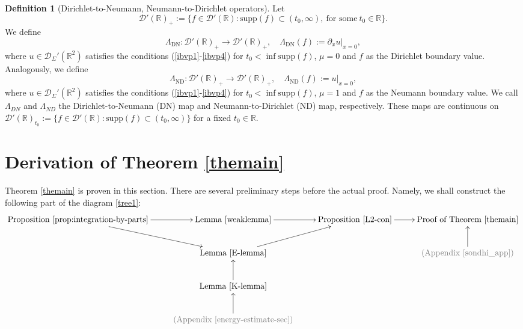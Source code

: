 \documentclass[10pt,a4paper]{article}
\theoremstyle{plain}
\theoremstyle{definition}
\newtheorem{definition}[theorem]{Definition}
\theoremstyle{remark}
\numberwithin{equation}{section}
\newcommand{\R}{\mathbb{R}}
\newcommand{\DN}{\Lambda_{\text{DN}}}
\newcommand{\ND}{\Lambda_{\text{ND}}}
\begin{document}
\begin{definition}[Dirichlet-to-Neumann, Neumann-to-Dirichlet operators]\label{DN-def}
Let $$\mathcal{D}'(\R)_{+} := \{ f \in \mathcal{D}'(\R) : \text{supp} (f) \subset (t_0,\infty), \ \text{for some} \ t_0 \in \R \}.$$
%
We define
\[
\DN  :  \mathcal{D}'(\R)_{+} \to  \mathcal{D}'(\R)_{+}, \quad  
 \DN (f) := \partial_x u |_{x=0},
 \]
  where  $u \in \mathcal{D}_\Sigma'(\R^2)$ satisfies the conditions (\ref{ibvp1}-\ref{ibvp4})  for $t_0 < \inf \text{supp} (f)$, $\mu=0$ and $f$ as the Dirichlet boundary value.  
Analogously, we define 
\[
\ND :  \mathcal{D}'(\R)_{+} \to  \mathcal{D}'(\R)_{+}, \quad  
\ND (f) :=  u |_{x=0}, 
\]
where  $u  \in \mathcal{D}_\Sigma'(\R^2)$ satisfies  the conditions (\ref{ibvp1}-\ref{ibvp4})  for $t_0 < \inf \text{supp} (f)$, $\mu=1$ and $f$ as the Neumann boundary value. 
We call $\Lambda_{DN}$ and $\Lambda_{ND}$ the Dirichlet-to-Neumann (DN) map  and Neumann-to-Dirichlet (ND) map, respectively. 
These maps are continuous on $\mathcal{D}'(\R)_{t_0} := \{ f \in \mathcal{D}'(\R) : \text{supp} (f) \subset (t_0,\infty) \}$ for a fixed $t_0 \in \R$. 
\end{definition}





\section{Derivation of Theorem \ref{themain}}\label{derivation-section}




Theorem \ref{themain} is proven in this section. There are several preliminary steps before the actual proof. 
Namely, we shall construct the following part of the diagram \eqref{tree1}:
\[
\xymatrix{
\text{Proposition \ref{prop:integration-by-parts}}  \ar[r] \ar[dr] & \text{Lemma \ref{weaklemma}} \ar[r] & \text{Proposition \ref{L2-con}}  \ar[r] & \text{Proof of Theorem \ref{themain}} \\
    & \text{Lemma \ref{E-lemma}}  \ar[ur] & & \ar[u] 
    {\color{gray}\text{(Appendix \ref{sondhi_app})}}
    \\
    & \text{Lemma \ref{K-lemma}} \ar[u] \\
    & \ar[u] 
    {\color{gray}\text{(Appendix \ref{energy-estimate-sec})}}
    }
\]
\end{document}
